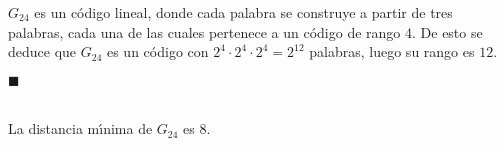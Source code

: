 $G_{24}$ es un c\'odigo lineal, donde cada palabra se construye a partir de
tres palabras, cada una de las cuales pertenece a un c\'odigo de rango $4$.
De esto se deduce que $G_{24}$ es un c\'odigo con $2^4\cdot 2^4\cdot 2^4=2^{12}$
palabras, luego su rango es $12$.
\begin{flushright}
$\blacksquare$
\end{flushright}

\begin{proposicion}
\ \\
La distancia m\'{\i}nima de $G_{24}$ es $8$.
\end{proposicion}
